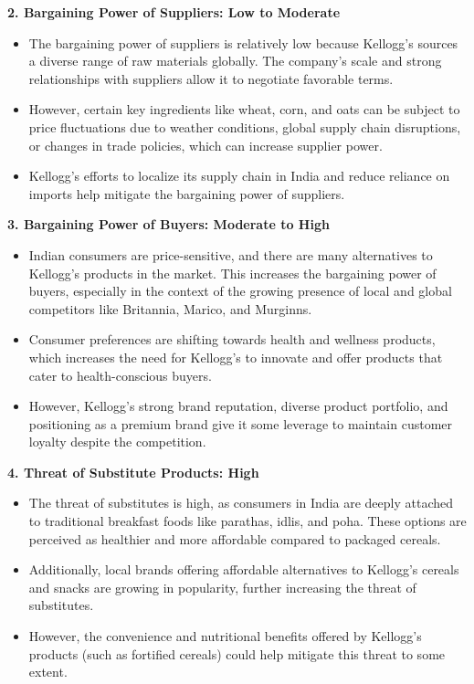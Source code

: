\documentclass[10pt,a4paper]{book}
\begin{document}
\vspace{0.5cm}

\textbf{2. Bargaining Power of Suppliers: Low to Moderate}
\begin{itemize}
    \item The bargaining power of suppliers is relatively low because Kellogg’s sources a diverse range of raw materials globally. The company’s scale and strong relationships with suppliers allow it to negotiate favorable terms.
    \item However, certain key ingredients like wheat, corn, and oats can be subject to price fluctuations due to weather conditions, global supply chain disruptions, or changes in trade policies, which can increase supplier power.
    \item Kellogg’s efforts to localize its supply chain in India and reduce reliance on imports help mitigate the bargaining power of suppliers.
\end{itemize}

\vspace{0.5cm}

\textbf{3. Bargaining Power of Buyers: Moderate to High}
\begin{itemize}
    \item Indian consumers are price-sensitive, and there are many alternatives to Kellogg’s products in the market. This increases the bargaining power of buyers, especially in the context of the growing presence of local and global competitors like Britannia, Marico, and Murginns.
    \item Consumer preferences are shifting towards health and wellness products, which increases the need for Kellogg’s to innovate and offer products that cater to health-conscious buyers.
    \item However, Kellogg’s strong brand reputation, diverse product portfolio, and positioning as a premium brand give it some leverage to maintain customer loyalty despite the competition.
\end{itemize}

\vspace{0.5cm}

\textbf{4. Threat of Substitute Products: High}
\begin{itemize}
    \item The threat of substitutes is high, as consumers in India are deeply attached to traditional breakfast foods like parathas, idlis, and poha. These options are perceived as healthier and more affordable compared to packaged cereals.
    \item Additionally, local brands offering affordable alternatives to Kellogg's cereals and snacks are growing in popularity, further increasing the threat of substitutes.
    \item However, the convenience and nutritional benefits offered by Kellogg’s products (such as fortified cereals) could help mitigate this threat to some extent.
\end{itemize}
\end{document}
